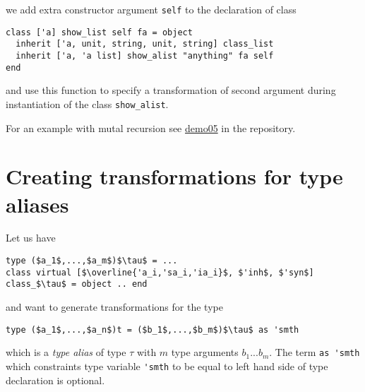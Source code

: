 \documentclass[acmsmall,review,anonymous]{acmart}\settopmatter{printfolios=true,printccs=false,printacmref=false}
\begin{document}
we add extra constructor argument \lstinline{self} to the declaration of class
\begin{lstlisting}
class ['a] show_list self fa = object
  inherit ['a, unit, string, unit, string] class_list
  inherit ['a, 'a list] show_alist "anything" fa self
end
\end{lstlisting}
and use this function to specify a transformation of second argument during instantiation of the class \lstinline{show_alist}.

% 
  
For an example with mutal recursion see \href{https://github.com/Kakadu/gt-demo/blob/master/src/demo05mutal.ml}{demo05} in the repository.

\section{Creating transformations for type aliases}
Let us have
\begin{lstlisting}
type ($a_1$,...,$a_m$)$\tau$ = ...
class virtual [$\overline{'a_i,'sa_i,'ia_i}$, $'inh$, $'syn$] class_$\tau$ = object .. end
\end{lstlisting}
and want to generate transformations for the type
\begin{lstlisting}
type ($a_1$,...,$a_n$)t = ($b_1$,...,$b_m$)$\tau$ as 'smth
\end{lstlisting}
which is a \textit{type alias} of type $\tau$ with $m$ type arguments $b_1$...$b_m$. The term \lstinline{as 'smth} which constraints type variable \lstinline{'smth} to be equal to left hand side of type declaration is optional.
\end{document}
